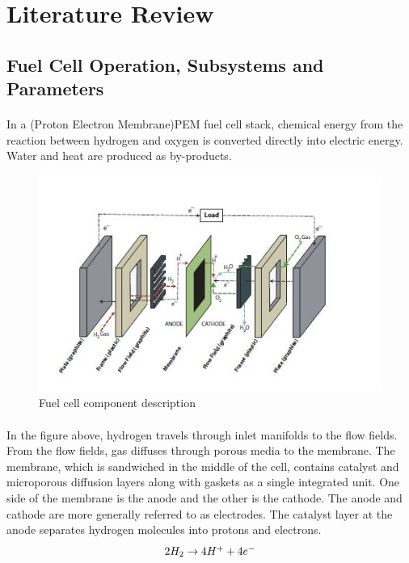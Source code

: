 \section{Literature Review}
\subsection{Fuel Cell Operation, Subsystems and Parameters}
\paragraph{}In a (Proton Electron Membrane)PEM fuel cell stack, chemical energy from the reaction between hydrogen and oxygen is converted directly into electric energy. Water and heat are produced as by-products.
\begin{figure}[!h]
\includegraphics{Figures/Figure5}
\caption{Fuel cell component description
\cite{stefanopoulou_mechatronics_nodate}}
\end{figure} 
\paragraph{}In the figure above, hydrogen travels through inlet manifolds to the flow fields. From the flow fields, gas diffuses through porous media to the membrane. The membrane, which is sandwiched in the middle of the cell, contains catalyst and microporous diffusion layers along with gaskets as a single integrated unit. One side of the membrane is  the anode and the other is the cathode. The anode and cathode are more generally referred to as electrodes. The catalyst layer at the anode separates hydrogen molecules into protons and electrons.
\begin{equation}
$$2H_{2} \rightarrow 4H^{+}+4e^{-}$$
\end{equation}
